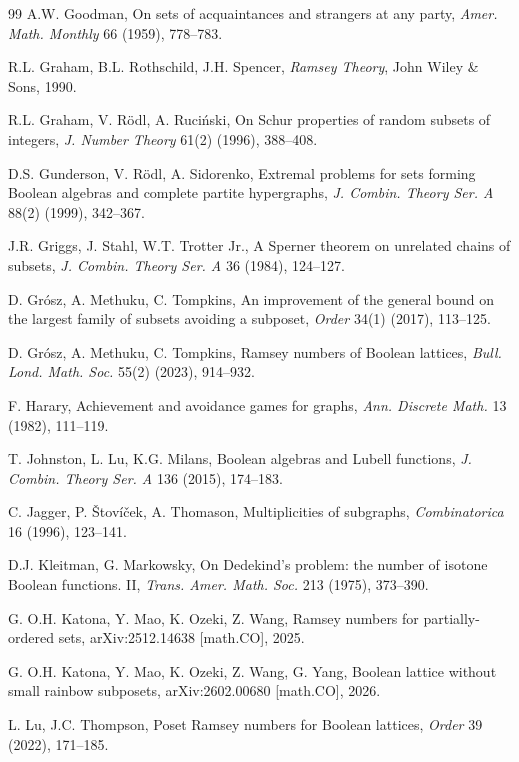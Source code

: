 \documentclass[twoside,12pt]{article}
\begin{document}
\begin{thebibliography}{99}
A.W. Goodman, On sets of acquaintances and strangers at any party, \emph{Amer. Math. Monthly} 66 (1959), 778--783.

R.L. Graham, B.L. Rothschild, J.H. Spencer, \emph{Ramsey Theory}, John Wiley \& Sons, 1990.

R.L. Graham, V. R\"odl, A. Ruci\'nski, On Schur properties of random subsets of integers, \emph{J. Number Theory} 61(2) (1996), 388--408.

D.S. Gunderson, V. R\"odl, A. Sidorenko, Extremal problems for sets forming Boolean algebras and complete partite hypergraphs, \emph{J. Combin. Theory Ser. A} 88(2) (1999), 342--367.

J.R. Griggs, J. Stahl, W.T. Trotter Jr., A Sperner theorem on unrelated chains of subsets, \emph{J. Combin. Theory Ser. A} 36 (1984), 124--127.

D. Gr\'osz, A. Methuku, C. Tompkins, An improvement of the general bound on the largest family of subsets avoiding a subposet, \emph{Order} 34(1) (2017), 113--125.

D. Gr\'osz, A. Methuku, C. Tompkins, Ramsey numbers of Boolean lattices, \emph{Bull. Lond. Math. Soc.} 55(2) (2023), 914--932.

F. Harary, Achievement and avoidance games for graphs, \emph{Ann. Discrete Math.} 13 (1982), 111--119.

T. Johnston, L. Lu, K.G. Milans, Boolean algebras and Lubell functions, \emph{J. Combin. Theory Ser. A} 136 (2015), 174--183.

C. Jagger, P. \v{S}tov\'i\v{c}ek, A. Thomason, Multiplicities of subgraphs, \emph{Combinatorica} 16 (1996), 123--141.

D.J. Kleitman, G. Markowsky, On Dedekind's problem: the number of isotone Boolean functions. II, \emph{Trans. Amer. Math. Soc.} 213 (1975), 373--390.

G. O.H. Katona, Y. Mao, K. Ozeki, Z. Wang, Ramsey numbers for partially-ordered sets, arXiv:2512.14638 [math.CO], 2025.

G. O.H. Katona, Y. Mao, K. Ozeki, Z. Wang, G. Yang, Boolean lattice without small rainbow subposets, arXiv:2602.00680 [math.CO], 2026.

L. Lu, J.C. Thompson, Poset Ramsey numbers for Boolean lattices, \emph{Order} 39 (2022), 171--185.


\end{thebibliography}
\end{document}
